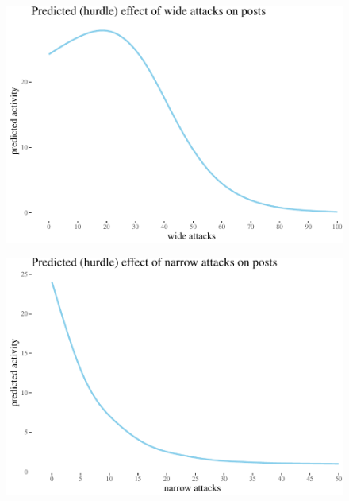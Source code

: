 \documentclass[10pt,dvipsnames]{scrartcl}
\begin{document}
\begin{figure}

\begin{center}\includegraphics[width=0.85\linewidth]{quittingShortAbridgedRevisions2_files/figure-latex/unnamed-chunk-49-1} \end{center}
\end{figure}

\begin{figure}


\begin{center}\includegraphics[width=0.85\linewidth]{quittingShortAbridgedRevisions2_files/figure-latex/unnamed-chunk-50-1} \end{center}
\end{figure}

\centering
\end{document}
